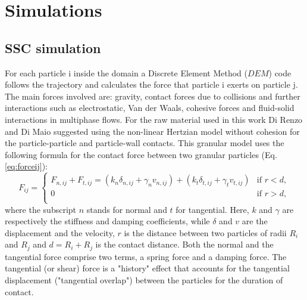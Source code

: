 \documentclass[review]{elsarticle}
\begin{document}
\newpage
\begin{appendix}
\label{appendix}

\section{Simulations}
\label{sec:appsimulations}

\subsection{SSC simulation}
\label{subsec:srsctsimulation}
For each particle i inside the domain a Discrete Element Method ($DEM$) code
follows the trajectory and calculates the force that particle i exerts on particle j.
The main forces involved are: gravity, contact forces due to collisions and further interactions such as electrostatic, 
Van der Waals, cohesive forces and fluid-solid interactions in multiphase flows. For the raw material used in this work 
Di Renzo and Di Maio \cite{RefWorks:145} suggested using the non-linear
Hertzian model without cohesion for the particle-particle and particle-wall contacts. 
This granular model uses the following formula for the contact force between two granular particles (Eq. \ref{eq:forceij}):
\begin{equation}
 F_{ij} = 
\begin{cases}
F_{n,ij} + F_{t,ij} = \left( k_n \delta_{n,ij} + \gamma_n v_{n,ij} \right) + \left( k_t \delta_{t,ij} + \gamma_t v_{t,ij} \right) & \text{if } r < d ,\\
0    & \text{if } r > d ,\\
\end{cases}
 \label{eq:forceij}
\end{equation}
where the subscript $n$ stands for normal and $t$ for tangential. 
Here, $k$ and $\gamma$ are respectively the stiffness and damping coefficients, 
while $\delta$ and $v$ are the displacement and the velocity, $r$ is the
distance between two particles of radii $R_i$ and $R_j$ and $d = R_i + R_j $ is the
contact distance.
Both the normal and the tangential
force comprise two terms, a spring force and a damping force. 
The tangential (or shear) force is a "history" effect that accounts for the
tangential displacement ("tangential overlap") between the particles for the duration of contact. 

\end{appendix}
\end{document}
